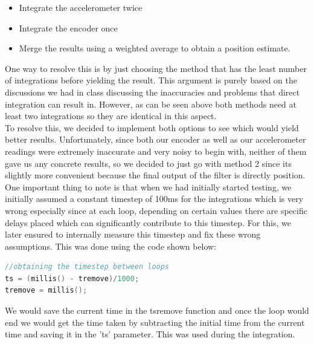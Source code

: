 \documentclass[conference]{IEEEtran}
\begin{document}
    \begin{itemize}
        \item Integrate the accelerometer twice
        \item Integrate the encoder once
        \item Merge the results using a weighted average to obtain a position estimate.\\
    \end{itemize}

    One way to resolve this is by just choosing the method that has the least
    number of integrations before yielding the result. This argument is purely based
    on the discussions we had in class discussing the inaccuracies and problems that
    direct integration can result in. However, as can be seen above both methods need
    at least two integrations so they are identical in this aspect.\\

    To resolve this, we decided to implement both options to see which would yield
    better results. Unfortunately, since both our encoder as well as our accelerometer
    readings were extremely inaccurate and very noisy to begin with, neither of them
    gave us any concrete results, so we decided to just go with method 2 since its
    slightly more convenient because the final output of the filter is directly position.\\

    One important thing to note is that when we had initially started testing, we
    initially assumed a constant timestep of 100ms for the integrations which is
    very wrong especially since at each loop, depending on certain values there are
    specific delays placed which can significantly contribute to this timestep.
    For this, we later ensured to internally measure this timestep and fix these
    wrong assumptions. This was done using the code shown below:

\begin{lstlisting}[language=C++, caption=Time Step Code]
//obtaining the timestep between loops  
ts = (millis() - tremove)/1000;  
tremove = millis();\end{lstlisting}
    
    We would save the current time in the tsremove function and once the loop would
    end we would get the time taken by subtracting the initial time from the current time
    and saving it in the 'ts' parameter. This was used during the integration.\\
\end{document}
